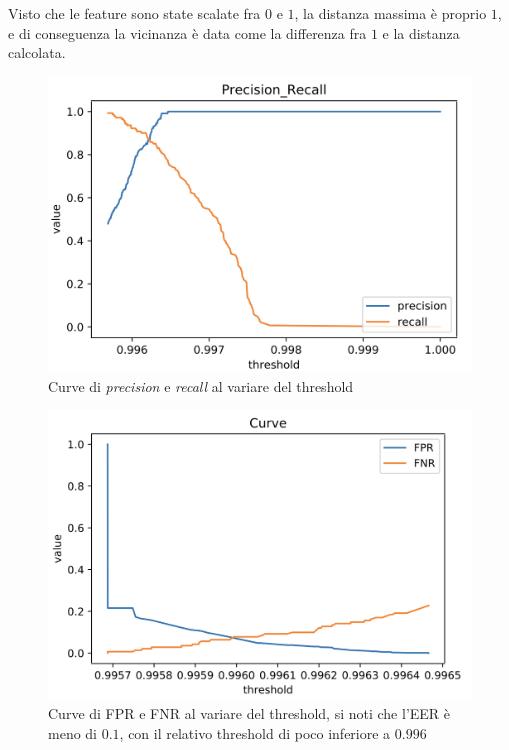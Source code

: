 \documentclass[8pt,notitlepage]{report}
\begin{document}
			Visto che le feature sono state scalate fra $ 0 $ e $ 1 $, la distanza massima è proprio $ 1 $, e di conseguenza la vicinanza è data come la differenza fra $ 1 $ e la distanza calcolata. 
			
			\begin{figure}[H]
				\begin{center}
					\includegraphics[scale=.45]{precision_recall_DTW_Antonio}
					\caption{Curve di \textit{precision} e \textit{recall} al variare del threshold}
				\end{center}
			\end{figure}
			
			\begin{figure}[H]
				\begin{center}
					\includegraphics[scale=.45]{fpr_fnr_DTW_Antonio}
					\caption{Curve di FPR e FNR al variare del threshold, si noti che l'EER è meno di $ 0.1 $, con il relativo threshold di poco inferiore a $ 0.996 $}
				\end{center}
			\end{figure}
		
\end{document}
